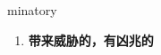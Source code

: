 
\begin{frame}
{\huge minatory}
\begin{center}
\begin{enumerate}\Large
  \item \textbf{带来威胁的，有凶兆的}
\end{enumerate}
\end{center}
\end{frame}
